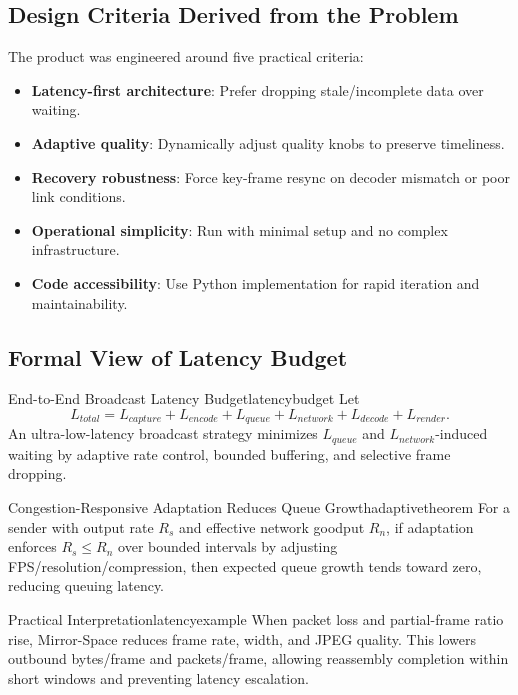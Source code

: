 \documentclass[12pt,a4paper]{article}
\begin{document}
\subsection{Design Criteria Derived from the Problem}
The product was engineered around five practical criteria:
\begin{itemize}[leftmargin=*, itemsep=4pt]
  \item \textbf{Latency-first architecture}: Prefer dropping stale/incomplete data over waiting.
  \item \textbf{Adaptive quality}: Dynamically adjust quality knobs to preserve timeliness.
  \item \textbf{Recovery robustness}: Force key-frame resync on decoder mismatch or poor link conditions.
  \item \textbf{Operational simplicity}: Run with minimal setup and no complex infrastructure.
  \item \textbf{Code accessibility}: Use Python implementation for rapid iteration and maintainability.
\end{itemize}

\subsection{Formal View of Latency Budget}
\begin{definition}{End-to-End Broadcast Latency Budget}{latencybudget}
Let
\[
L_{total} = L_{capture} + L_{encode} + L_{queue} + L_{network} + L_{decode} + L_{render}.
\]
An ultra-low-latency broadcast strategy minimizes \(L_{queue}\) and \(L_{network}\)-induced waiting by adaptive rate control, bounded buffering, and selective frame dropping.
\end{definition}

\begin{theorem}{Congestion-Responsive Adaptation Reduces Queue Growth}{adaptivetheorem}
For a sender with output rate \(R_s\) and effective network goodput \(R_n\), if adaptation enforces \(R_s \leq R_n\) over bounded intervals by adjusting FPS/resolution/compression, then expected queue growth tends toward zero, reducing queuing latency.
\end{theorem}

\begin{example}{Practical Interpretation}{latencyexample}
When packet loss and partial-frame ratio rise, Mirror-Space reduces frame rate, width, and JPEG quality. This lowers outbound bytes/frame and packets/frame, allowing reassembly completion within short windows and preventing latency escalation.
\end{example}
\end{document}
